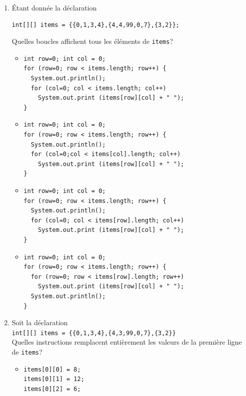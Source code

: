\documentclass[10pt,a4paper]{article}
\newcommand{\boxitem}{\item[\(\Box\)]}
\begin{document}
\begin{enumerate}
  \item Étant donnée la déclaration
  {\small
  \begin{verbatim}
int[][] items = {{0,1,3,4},{4,4,99,0,7},{3,2}};
  \end{verbatim}}
  \vspace*{-15pt}
  Quelles boucles affichent tous les éléments de {\small \verb+items+}?
  \begin{itemize}
    \boxitem
      {\small
       \begin{verbatim}
int row=0; int col = 0;
for (row=0; row < items.length; row++) {
  System.out.println();
  for (col=0; col < items.length; col++)
    System.out.print (items[row][col] + " ");
}
      \end{verbatim}}
      \vspace*{-10pt}
    \boxitem
      {\small \begin{verbatim}
int row=0; int col = 0;
for (row=0; row < items.length; row++) {
  System.out.println();
  for (col=0;col < items[col].length; col++)
    System.out.print (items[row][col] + " ");
}
      \end{verbatim}}
      \vspace*{-10pt}
    \boxitem
      {\small \begin{verbatim}
int row=0; int col = 0;
for (row=0; row < items.length; row++) {
  System.out.println();
  for (col=0; col < items[row].length; col++)
    System.out.print (items[row][col] + " ");
}
      \end{verbatim}}
      \vspace*{-10pt}
    \boxitem
      {\small \begin{verbatim}
int row=0; int col = 0;
for (row=0; row < items.length; row++) {
  for (row=0; row < items[row].length; row++)
    System.out.print (items[row][col] + " ");
  System.out.println();
}
      \end{verbatim}}
  \end{itemize}

  \item Soit la déclaration\\
  {\small \verb+int[][] items = {{0,1,3,4},{4,3,99,0,7},{3,2}}+}\\
  Quelles instructions remplacent entièrement les valeurs de la
  première ligne de {\small \texttt{items}}?
  \begin{itemize}

      \boxitem
      {\small \begin{verbatim}
items[0][0] = 8;
items[0][1] = 12;
items[0][2] = 6;
      \end{verbatim}}
      \vspace*{-10pt}


\end{itemize}
\end{enumerate}
\end{document}

